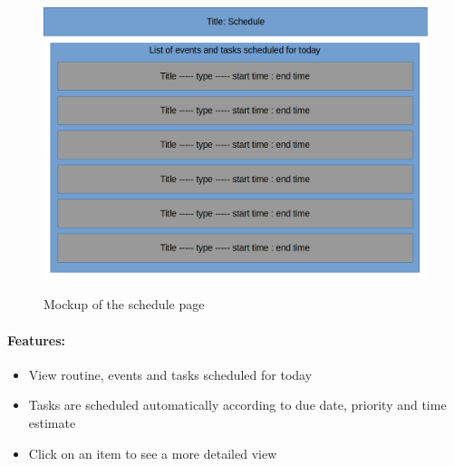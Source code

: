 \documentclass{article}
\begin{document}
\begin{minipage}{0.5\textwidth}
	\begin{figure}[H]
		\includegraphics[width=\linewidth]{Mockups/schedule.png}
		\label{fig:schedule_mockup}
		\caption{Mockup of the schedule page}
	\end{figure}
\end{minipage} \hfill
\begin{minipage}{0.45\textwidth}
	\paragraph{Features:}
	\begin{itemize}
		\item View routine, events and tasks scheduled for today
		\item Tasks are scheduled automatically according to due date, priority and time estimate
		\item Click on an item to see a more detailed view
	\end{itemize}
\end{minipage}
\end{document}
